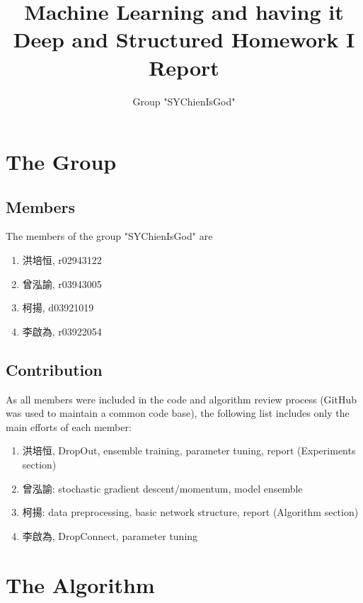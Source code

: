 \documentclass[]{article}
\title{Machine Learning and having it Deep and Structured Homework I Report}
\author{Group "SYChienIsGod"}
\begin{document}
\maketitle


\section{The Group}
\subsection{Members}
The members of the group "SYChienIsGod" are
\begin{CJK}{UTF8}{bsmi}
\begin{enumerate}
	\item 洪培恒, r02943122
	\item 曾泓諭, r03943005
	\item 柯揚, d03921019
	\item 李啟為, r03922054 
\end{enumerate}
\end{CJK}
\subsection{Contribution}
As all members were included in the code and algorithm review process (GitHub was used to maintain a common code base), the following list includes only the main efforts of each member:
\begin{CJK}{UTF8}{bsmi}
	\begin{enumerate}
		\item 洪培恒, DropOut, ensemble training, parameter tuning, report (Experiments section)
		\item 曾泓諭: stochastic gradient descent/momentum, model ensemble
		\item 柯揚: data preprocessing, basic network structure, report (Algorithm section)
		\item 李啟為, DropConnect, parameter tuning
	\end{enumerate}
\end{CJK}
\section{The Algorithm}
\end{document}
